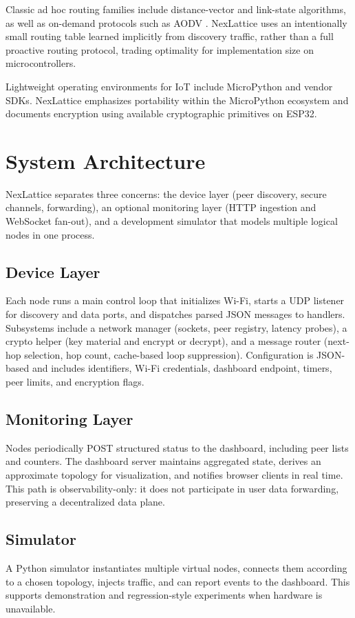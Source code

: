 \documentclass[conference]{IEEEtran}
\begin{document}
Classic ad hoc routing families include distance-vector and link-state algorithms, as well as on-demand protocols such as AODV \cite{aodv}. NexLattice uses an intentionally small routing table learned implicitly from discovery traffic, rather than a full proactive routing protocol, trading optimality for implementation size on microcontrollers.

Lightweight operating environments for IoT include MicroPython \cite{micropython} and vendor SDKs. NexLattice emphasizes portability within the MicroPython ecosystem and documents encryption using available cryptographic primitives on ESP32.

\section{System Architecture}
NexLattice separates three concerns: the device layer (peer discovery, secure channels, forwarding), an optional monitoring layer (HTTP ingestion and WebSocket fan-out), and a development simulator that models multiple logical nodes in one process.

\subsection{Device Layer}
Each node runs a main control loop that initializes Wi-Fi, starts a UDP listener for discovery and data ports, and dispatches parsed JSON messages to handlers. Subsystems include a network manager (sockets, peer registry, latency probes), a crypto helper (key material and encrypt or decrypt), and a message router (next-hop selection, hop count, cache-based loop suppression). Configuration is JSON-based and includes identifiers, Wi-Fi credentials, dashboard endpoint, timers, peer limits, and encryption flags.

\subsection{Monitoring Layer}
Nodes periodically POST structured status to the dashboard, including peer lists and counters. The dashboard server maintains aggregated state, derives an approximate topology for visualization, and notifies browser clients in real time. This path is observability-only: it does not participate in user data forwarding, preserving a decentralized data plane.

\subsection{Simulator}
A Python simulator instantiates multiple virtual nodes, connects them according to a chosen topology, injects traffic, and can report events to the dashboard. This supports demonstration and regression-style experiments when hardware is unavailable.
\end{document}
